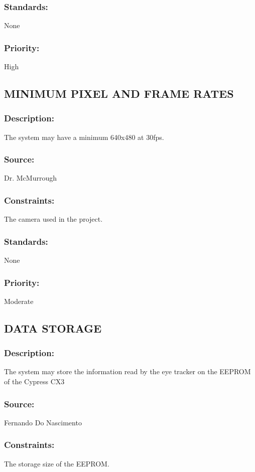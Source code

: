 \subsubsection{Standards:} 
	{None}
\subsubsection{Priority:} 
	{High}

\subsection{\text MINIMUM PIXEL AND FRAME RATES }
\subsubsection{Description:} 
	{The system may have a minimum 640x480 at 30fps.}
\subsubsection{Source: }
	{Dr. McMurrough}
\subsubsection{Constraints:} 
	{The camera used in the project.}
\subsubsection{Standards:} 
	{None}
\subsubsection{Priority:} 
	{Moderate}

\subsection{\text DATA STORAGE}
\subsubsection{Description:} 
	{The system may store the information read by the eye tracker on the EEPROM of the Cypress CX3}
\subsubsection{Source:} 
	{Fernando Do Nascimento}
\subsubsection{Constraints:} 
	{The storage size of the EEPROM.}
